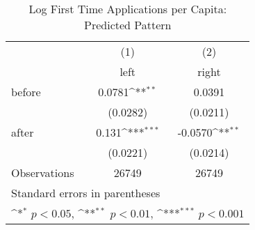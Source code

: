 \begin{table}[htbp]\centering
\def\sym#1{\ifmmode^{#1}\else\(^{#1}\)\fi}
\caption{Log First Time Applications per Capita: Predicted Pattern}
\begin{tabular}{l*{2}{c}}
\hline\hline
                    &\multicolumn{1}{c}{(1)}&\multicolumn{1}{c}{(2)}\\
                    &\multicolumn{1}{c}{left}&\multicolumn{1}{c}{right}\\
\hline
before              &      0.0781\sym{**} &      0.0391         \\
                    &    (0.0282)         &    (0.0211)         \\
[1em]
after               &       0.131\sym{***}&     -0.0570\sym{**} \\
                    &    (0.0221)         &    (0.0214)         \\
\hline
Observations        &       26749         &       26749         \\
\hline\hline
\multicolumn{3}{l}{\footnotesize Standard errors in parentheses}\\
\multicolumn{3}{l}{\footnotesize \sym{*} \(p<0.05\), \sym{**} \(p<0.01\), \sym{***} \(p<0.001\)}\\
\end{tabular}
\end{table}
